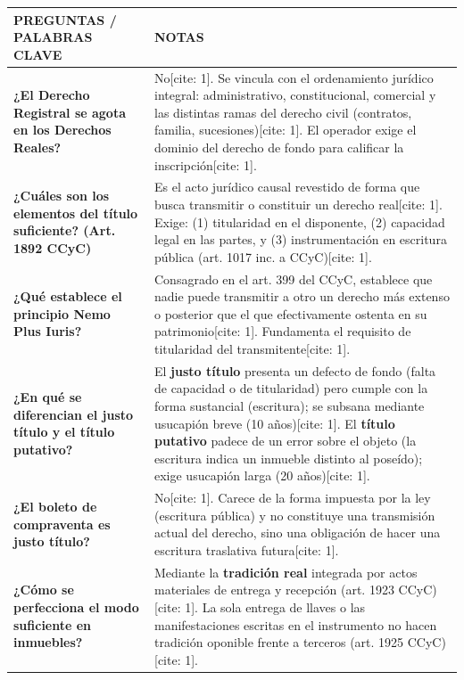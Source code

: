 \documentclass[12pt,oneside]{book}
\begin{document}
\begin{longtable}{|p{4.5cm}|p{10.5cm}|}
\hline
\textbf{PREGUNTAS / PALABRAS CLAVE} & \textbf{NOTAS} \\
\hline
\endhead

\textbf{¿El Derecho Registral se agota en los Derechos Reales?} &
No[cite: 1]. Se vincula con el ordenamiento jurídico integral: administrativo, constitucional, comercial y las distintas ramas del derecho civil (contratos, familia, sucesiones)[cite: 1]. El operador exige el dominio del derecho de fondo para calificar la inscripción[cite: 1]. \\ \hline

\textbf{¿Cuáles son los elementos del título suficiente? (Art. 1892 CCyC)} &
Es el acto jurídico causal revestido de forma que busca transmitir o constituir un derecho real[cite: 1]. Exige: (1) titularidad en el disponente, (2) capacidad legal en las partes, y (3) instrumentación en escritura pública (art. 1017 inc. a CCyC)[cite: 1]. \\ \hline

\textbf{¿Qué establece el principio Nemo Plus Iuris?} &
Consagrado en el art. 399 del CCyC, establece que nadie puede transmitir a otro un derecho más extenso o posterior que el que efectivamente ostenta en su patrimonio[cite: 1]. Fundamenta el requisito de titularidad del transmitente[cite: 1]. \\ \hline

\textbf{¿En qué se diferencian el justo título y el título putativo?} &
El \textbf{justo título} presenta un defecto de fondo (falta de capacidad o de titularidad) pero cumple con la forma sustancial (escritura); se subsana mediante usucapión breve (10 años)[cite: 1]. El \textbf{título putativo} padece de un error sobre el objeto (la escritura indica un inmueble distinto al poseído); exige usucapión larga (20 años)[cite: 1]. \\ \hline

\textbf{¿El boleto de compraventa es justo título?} &
No[cite: 1]. Carece de la forma impuesta por la ley (escritura pública) y no constituye una transmisión actual del derecho, sino una obligación de hacer una escritura traslativa futura[cite: 1]. \\ \hline

\textbf{¿Cómo se perfecciona el modo suficiente en inmuebles?} &
Mediante la \textbf{tradición real} integrada por actos materiales de entrega y recepción (art. 1923 CCyC)[cite: 1]. La sola entrega de llaves o las manifestaciones escritas en el instrumento no hacen tradición oponible frente a terceros (art. 1925 CCyC)[cite: 1]. \\ \hline


\end{longtable}
\end{document}

